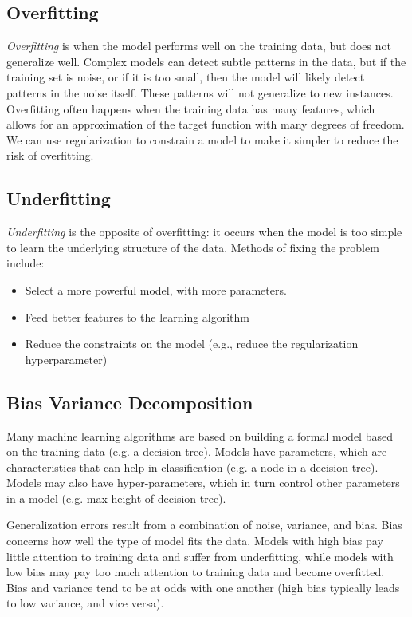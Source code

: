 \documentclass[12pt]{article}
\begin{document}
    \subsection{Overfitting}
        \textit{Overfitting} is when the model performs well on the training data, but does not generalize well. Complex models can detect subtle patterns in the data,
        but if the training set is noise, or if it is too small, then the model will likely detect patterns in the noise itself. These patterns will not generalize to
        new instances. Overfitting often happens when the training data has many features, which allows for an approximation of the target function with many degrees of freedom.
        We can use regularization to constrain a model to make it simpler to reduce the risk of overfitting.

    \subsection{Underfitting}
        \textit{Underfitting} is the opposite of overfitting: it occurs when the model is too simple to learn the underlying structure of the data. Methods of fixing the problem include:
        \begin{itemize}
            \item Select a more powerful model, with more parameters.
            \item Feed better features to the learning algorithm
            \item Reduce the constraints on the model (e.g., reduce the regularization hyperparameter)
        \end{itemize}

    \subsection{Bias Variance Decomposition}
        Many machine learning algorithms are based on building a formal model based on the training data (e.g. a decision tree). Models have
        parameters, which are characteristics that can help in classification (e.g. a node in a decision tree). Models may also have hyper-parameters,
        which in turn control other parameters in a model (e.g. max height of decision tree).

        Generalization errors result from a combination of noise, variance, and bias. Bias concerns how well the type of model fits the data. Models
        with high bias pay little attention to training data and suffer from underfitting, while models with low bias may pay too much attention to
        training data and become overfitted. Bias and variance tend to be at odds with one another (high bias typically leads to low variance, and vice
        versa).
\end{document}
